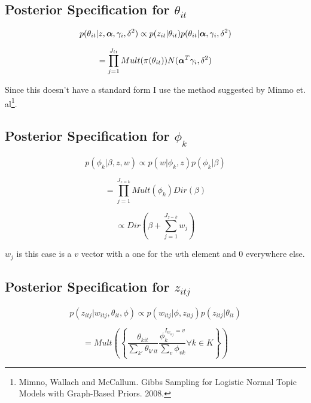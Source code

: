 \documentclass[a4paper]{article}
\begin{document}
\subsection{Posterior Specification for $\theta_{it}$}

\[p(\theta_{it} | z, \text{\boldmath$\alpha$}, \gamma_i, \delta^2) \propto p(z_{it}| \theta_{it}) p(\theta_{it} | \text{\boldmath$\alpha$}, \gamma_i, \delta^2)\]

\[= \prod_{j=1}^{J_{it}} Mult(\pi(\theta_{it})) N(\text{\boldmath$\alpha$}^T\gamma_i, \delta^2)\]

Since this doesn't have a standard form I use the method suggested by Minmo et. al\footnote{Mimno, Wallach and McCallum. Gibbs Sampling for Logistic Normal Topic Models with Graph-Based Priors. 2008.}.

\subsection{Posterior Specification for $\phi_k$}

\[p(\phi_k | \beta, z, w) \propto p(w | \phi_k, z) p(\phi_k | \beta)\]

\[= \prod_{j=1}^{J_{z=k}} Mult(\phi_k) Dir(\beta)\]

\[\propto Dir\left(\beta + \sum_{j=1}^{J_{z=k}}w_j \right)\]

$w_j$ is this case is a $v$ vector with a one for the $w$th element and 0 everywhere else.

\subsection{Posterior Specification for $z_{itj}$}

\[p(z_{itj} | w_{itj}, \theta_{it}, \phi) \propto p(w_{itj} | \phi, z_{itj}) p(z_{itj} | \theta_{it})\]

\[= Mult\left(\left\{\frac{\theta_{kit}}{\sum_{k'} \theta_{k'it}}\frac{\phi_{k}^{I_{w_{itj}}=v}}{\sum_v \phi_{vk}} \forall k \in K \right\}\right)\]
\end{document}
